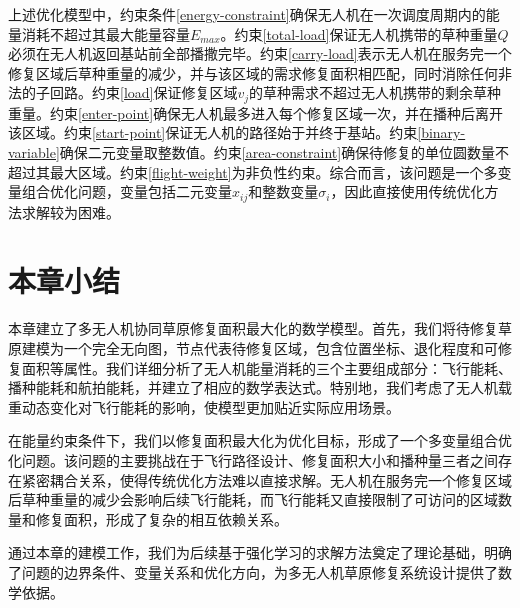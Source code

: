 \documentclass[AutoFakeBold]{LZUThesis}
\begin{document}
上述优化模型中，约束条件\eqref{energy-constraint}确保无人机在一次调度周期内的能量消耗不超过其最大能量容量$E_{max}$。约束\eqref{total-load}保证无人机携带的草种重量$Q$必须在无人机返回基站前全部播撒完毕。约束\eqref{carry-load}表示无人机在服务完一个修复区域后草种重量的减少，并与该区域的需求修复面积相匹配，同时消除任何非法的子回路。约束\eqref{load}保证修复区域$v_j$的草种需求不超过无人机携带的剩余草种重量。约束\eqref{enter-point}确保无人机最多进入每个修复区域一次，并在播种后离开该区域。约束\eqref{start-point}保证无人机的路径始于并终于基站。约束\eqref{binary-variable}确保二元变量取整数值。约束\eqref{area-constraint}确保待修复的单位圆数量不超过其最大区域。约束\eqref{flight-weight}为非负性约束。综合而言，该问题是一个多变量组合优化问题，变量包括二元变量$x_{ij}$和整数变量$\sigma_i$，因此直接使用传统优化方法求解较为困难。


\section{本章小结}

本章建立了多无人机协同草原修复面积最大化的数学模型。首先，我们将待修复草原建模为一个完全无向图，节点代表待修复区域，包含位置坐标、退化程度和可修复面积等属性。我们详细分析了无人机能量消耗的三个主要组成部分：飞行能耗、播种能耗和航拍能耗，并建立了相应的数学表达式。特别地，我们考虑了无人机载重动态变化对飞行能耗的影响，使模型更加贴近实际应用场景。

在能量约束条件下，我们以修复面积最大化为优化目标，形成了一个多变量组合优化问题。该问题的主要挑战在于飞行路径设计、修复面积大小和播种量三者之间存在紧密耦合关系，使得传统优化方法难以直接求解。无人机在服务完一个修复区域后草种重量的减少会影响后续飞行能耗，而飞行能耗又直接限制了可访问的区域数量和修复面积，形成了复杂的相互依赖关系。

通过本章的建模工作，我们为后续基于强化学习的求解方法奠定了理论基础，明确了问题的边界条件、变量关系和优化方向，为多无人机草原修复系统设计提供了数学依据。

\end{document}
